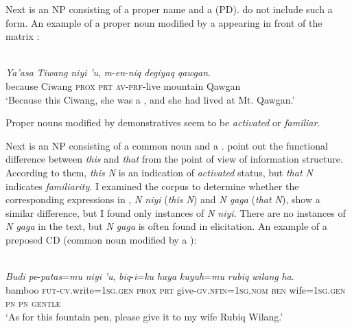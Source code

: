 \documentclass[output=paper
,modfonts
,nonflat]{langsci/langscibook}
\begin{document}
\noindent
Next is an NP consisting of a proper name and a  (PD). \citet{Gundel1993} do not include such a form. An example of a proper noun modified by a  appearing in front of the matrix :

\begin{exe}
	\label{e:tsukida:37}\\
	\gll \textit{Ya'asa} \textit{Tiwang} \textit{niyi}  \textit{'u},   \textit{m}-\textit{en}-\textit{niq}  \textit{degiyaq}   \textit{qawgan}.\\
	because Ciwang \textsc{prox} \textsc{prt} \textsc{av}-\textsc{prf}-live  mountain Qawgan\\
	\glt ‘Because this Ciwang, she was a , and she had lived at Mt. Qawgan.’
\end{exe}

\noindent
Proper nouns modified by demonstratives seem to be \textit{activated} or \textit{familiar}.

Next is an NP consisting of a common noun and a . \citet{Gundel1993} point out the functional difference between \textit{this} and \textit{that} from the point of view of information structure. According to them, \textit{this N} is an indication of \textit{activated} status, but \textit{that N} indicates \textit{familiarity}. I examined the corpus to determine whether the corresponding expressions in , \textit{N niyi} (\textit{this N}) and \textit{N gaga} (\textit{that N}), show a similar difference, but I found only instances of \textit{N niyi}. There are no instances of \textit{N gaga} in the text, but \textit{N gaga} is often found in elicitation. An example of a preposed CD (common noun modified by a ):

\begin{exe}
	\label{e:tsukida:38}\\
	\gll \textit{Budi} \textit{pe}-\textit{patas}=\textit{mu} \textit{niyi} \textit{'u}, \textit{biq}-\textit{i}=\textit{ku} \textit{haya}   \textit{kuyuh}=\textit{mu}   \textit{rubiq}   \textit{wilang}  \textit{ha}.\\
	bamboo \textsc{fut}-\textsc{cv}.write=\textsc{1sg}.\textsc{gen} \textsc{prox} \textsc{prt} give-\textsc{gv.nfin}=\textsc{1sg}.\textsc{nom} \textsc{ben} wife=\textsc{1sg}.\textsc{gen} \textsc{pn} \textsc{pn} \textsc{gentle}\\
	\glt ‘As for this fountain pen, please give it to my wife Rubiq Wilang.’
\end{exe}
\end{document}
